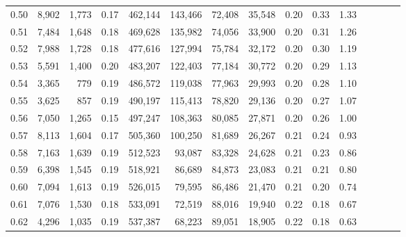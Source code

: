 \begin{tabular}{rrrcrrrrrrrrrrr}
0.50 &   8,902 &  1,773 &                                       0.17 &  462,144 &  143,466 &   72,408 &   35,548 &  0.20 &  0.33 &                         1.33 \\
0.51 &   7,484 &  1,648 &                                       0.18 &  469,628 &  135,982 &   74,056 &   33,900 &  0.20 &  0.31 &                         1.26 \\
0.52 &   7,988 &  1,728 &                                       0.18 &  477,616 &  127,994 &   75,784 &   32,172 &  0.20 &  0.30 &                         1.19 \\
0.53 &   5,591 &  1,400 &                                       0.20 &  483,207 &  122,403 &   77,184 &   30,772 &  0.20 &  0.29 &                         1.13 \\
0.54 &   3,365 &    779 &                                       0.19 &  486,572 &  119,038 &   77,963 &   29,993 &  0.20 &  0.28 &                         1.10 \\
0.55 &   3,625 &    857 &                                       0.19 &  490,197 &  115,413 &   78,820 &   29,136 &  0.20 &  0.27 &                         1.07 \\
0.56 &   7,050 &  1,265 &                                       0.15 &  497,247 &  108,363 &   80,085 &   27,871 &  0.20 &  0.26 &                         1.00 \\
0.57 &   8,113 &  1,604 &                                       0.17 &  505,360 &  100,250 &   81,689 &   26,267 &  0.21 &  0.24 &                         0.93 \\
0.58 &   7,163 &  1,639 &                                       0.19 &  512,523 &   93,087 &   83,328 &   24,628 &  0.21 &  0.23 &                         0.86 \\
0.59 &   6,398 &  1,545 &                                       0.19 &  518,921 &   86,689 &   84,873 &   23,083 &  0.21 &  0.21 &                         0.80 \\
0.60 &   7,094 &  1,613 &                                       0.19 &  526,015 &   79,595 &   86,486 &   21,470 &  0.21 &  0.20 &                         0.74 \\
0.61 &   7,076 &  1,530 &                                       0.18 &  533,091 &   72,519 &   88,016 &   19,940 &  0.22 &  0.18 &                         0.67 \\
0.62 &   4,296 &  1,035 &                                       0.19 &  537,387 &   68,223 &   89,051 &   18,905 &  0.22 &  0.18 &                         0.63 \\

\end{tabular}
